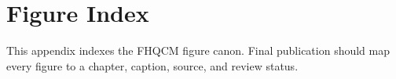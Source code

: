 \chapter{Figure Index}

This appendix indexes the FHQCM figure canon. Final publication should map every figure to a chapter, caption, source, and review status.
